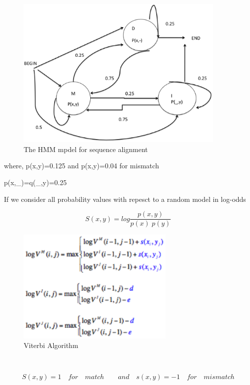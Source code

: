 \documentclass[english, a4paper,11pt]{article}
\begin{document}
%
\begin{figure}
\begin{centering}
\includegraphics[width=4in]{Slide5}
\par\end{centering}

\caption{The HMM mpdel for sequence alignment}
%
\end{figure}


where, p(x,y)=0.125 and p(x,y)=0.04 for mismatch

p(x,\_)=q(\_,y)=0.25

If we consider all probability values with repesct to a random model
in log-odds

\[
S(x,y)=log\frac{p(x,y)}{p(x)\; p(y)}\]


%
\begin{figure}
\begin{centering}
\includegraphics[width=3in]{Viterbi}
\par\end{centering}

\caption{Viterbi Algorithm}
%
\end{figure}
$ $

\[
S(x,y)=1\quad for\quad match\qquad and\quad s(x,y)=-1\quad for\quad mismatch\]
\end{document}
